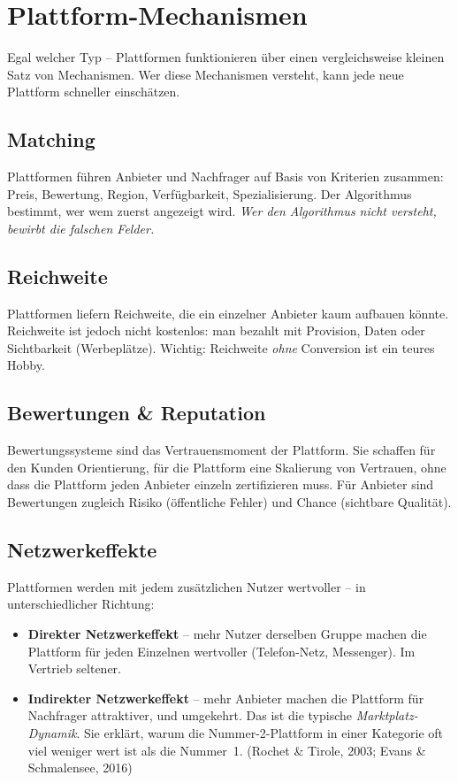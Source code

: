 \documentclass[11pt,a4paper,oneside]{article}
\newcommand{\fachbegriff}[1]{\textbf{#1}}
\newcommand{\quelle}[1]{{\footnotesize\color{lpGray}(#1)}}
\begin{document}
\section{Plattform-Mechanismen}

Egal welcher Typ -- Plattformen funktionieren über einen vergleichsweise kleinen Satz von Mechanismen. Wer diese Mechanismen versteht, kann jede neue Plattform schneller einschätzen.

\subsection{Matching}

Plattformen führen Anbieter und Nachfrager auf Basis von Kriterien zusammen: Preis, Bewertung, Region, Verfügbarkeit, Spezialisierung. Der Algorithmus bestimmt, wer wem zuerst angezeigt wird. \emph{Wer den Algorithmus nicht versteht, bewirbt die falschen Felder.}

\subsection{Reichweite}

Plattformen liefern Reichweite, die ein einzelner Anbieter kaum aufbauen könnte. Reichweite ist jedoch nicht kostenlos: man bezahlt mit Provision, Daten oder Sichtbarkeit (Werbeplätze). Wichtig: Reichweite \emph{ohne} Conversion ist ein teures Hobby.

\subsection{Bewertungen \& Reputation}

Bewertungssysteme sind das Vertrauensmoment der Plattform. Sie schaffen für den Kunden Orientierung, für die Plattform eine Skalierung von Vertrauen, ohne dass die Plattform jeden Anbieter einzeln zertifizieren muss. Für Anbieter sind Bewertungen zugleich Risiko (öffentliche Fehler) und Chance (sichtbare Qualität).

\subsection{Netzwerkeffekte}

Plattformen werden mit jedem zusätzlichen Nutzer wertvoller -- in unterschiedlicher Richtung:

\begin{itemize}
  \item \fachbegriff{Direkter Netzwerkeffekt} -- mehr Nutzer derselben Gruppe machen die Plattform für jeden Einzelnen wertvoller (Telefon-Netz, Messenger). Im Vertrieb seltener.
  \item \fachbegriff{Indirekter Netzwerkeffekt} -- mehr Anbieter machen die Plattform für Nachfrager attraktiver, und umgekehrt. Das ist die typische \emph{Marktplatz-Dynamik}. Sie erklärt, warum die Nummer-2-Plattform in einer Kategorie oft viel weniger wert ist als die Nummer~1. \quelle{Rochet \& Tirole, 2003; Evans \& Schmalensee, 2016}
\end{itemize}
\end{document}
